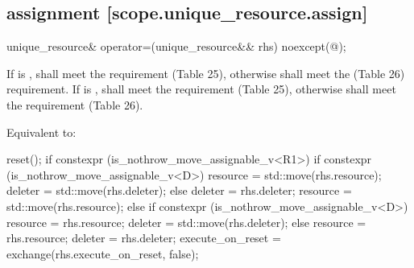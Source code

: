 \documentclass[ebook,11pt,article]{memoir}
\begin{document}
\subsection { assignment [scope.unique_resource.assign]}

\begin{itemdecl}
unique_resource& operator=(unique_resource&& rhs) noexcept(@\seebelow@);
\end{itemdecl}

\begin{itemdescr}
\pnum
\requires %
If  is ,  shall meet the  requirement (Table 25), otherwise  shall meet the  (Table 26) requirement.
If  is ,  shall meet the  requirement (Table 25), otherwise  shall meet the  requirement (Table 26).

\pnum
\effects Equivalent to:
\begin{codeblock}
    reset();
    if constexpr (is_nothrow_move_assignable_v<R1>) {
        if constexpr (is_nothrow_move_assignable_v<D>) {
            resource = std::move(rhs.resource); 
            deleter  = std::move(rhs.deleter); 
        } else {
            deleter  = rhs.deleter; 
            resource = std::move(rhs.resource); 
        }
    } else {
        if constexpr (is_nothrow_move_assignable_v<D>) {
            resource = rhs.resource; 
            deleter  = std::move(rhs.deleter); 
        } else {
            resource = rhs.resource; 
            deleter  = rhs.deleter; 
        }
    }
    execute_on_reset = exchange(rhs.execute_on_reset, false);
\end{codeblock}


\end{itemdescr}
\end{document}
